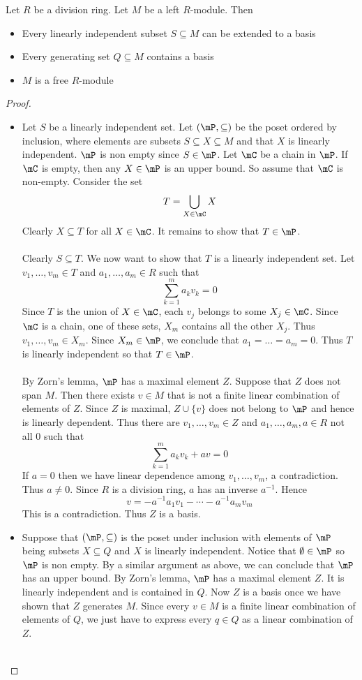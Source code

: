 \documentclass[a4paper]{article}
\begin{document}
\begin{thm}{}{} Let $R$ be a division ring. Let $M$ be a left $R$-module. Then
\begin{itemize}
\item Every linearly independent subset $S\subseteq M$ can be extended to a basis
\item Every generating set $Q\subseteq M$ contains a basis
\item $M$ is a free $R$-module
\end{itemize} 
\begin{proof}~\\
\begin{itemize}
\item Let $S$ be a linearly independent set. Let $(\mP,\subseteq)$ be the poset ordered by inclusion, where elements are subsets $S\subseteq X\subseteq M$ and that $X$ is linearly independent. $\mP$ is non empty since $S\in\mP$. Let $\mC$ be a chain in $\mP$. If $\mC$ is empty, then any $X\in\mP$ is an upper bound. So assume that $\mC$ is non-empty. Consider the set $$T=\bigcup_{X\in\mC}X$$ Clearly $X\subseteq T$ for all $X\in\mC$. It remains to show that $T\in\mP$. \\~\\

Clearly $S\subseteq T$. We now want to show that $T$ is a linearly independent set. Let $v_1,\dots,v_m\in T$ and $a_1,\dots,a_m\in R$ such that $$\sum_{k=1}^ma_kv_k=0$$ Since $T$ is the union of $X\in\mC$, each $v_j$ belongs to some $X_j\in\mC$. Since $\mC$ is a chain, one of these sets, $X_m$ contains all the other $X_j$. Thus $v_1,\dots,v_m\in X_m$. Since $X_m\in\mP$, we conclude that $a_1=\dots=a_m=0$. Thus $T$ is linearly independent so that $T\in\mP$. \\~\\

By Zorn's lemma, $\mP$ has a maximal element $Z$. Suppose that $Z$ does not span $M$. Then there exists $v\in M$ that is not a finite linear combination of elements of $Z$. Since $Z$ is maximal, $Z\cup\{v\}$ does not belong to $\mP$ and hence is linearly dependent. Thus there are $v_1,\dots,v_m\in Z$ and $a_1,\dots,a_m,a\in R$ not all $0$ such that $$\sum_{k=1}^ma_kv_k+av=0$$ If $a=0$ then we have linear dependence among $v_1,\dots,v_m$, a contradiction. Thus $a\neq 0$. Since $R$ is a division ring, $a$ has an inverse $a^{-1}$. Hence $$v=-a^{-1}a_1v_1-\cdots-a^{-1}a_mv_m$$ This is a contradiction. Thus $Z$ is a basis. 

\item Suppose that $(\mP,\subseteq)$ is the poset under inclusion with elements of $\mP$ being subsets $X\subseteq Q$ and $X$ is linearly independent. Notice that $\emptyset\in\mP$ so $\mP$ is non empty. By a similar argument as above, we can conclude that $\mP$ has an upper bound. By Zorn's lemma, $\mP$ has a maximal element $Z$. It is linearly independent and is contained in $Q$. Now $Z$ is a basis once we have shown that $Z$ generates $M$. Since every $v\in M$ is a finite linear combination of elements of $Q$, we just have to express every $q\in Q$ as a linear combination of $Z$. \\~\\


\end{itemize}
\end{proof}
\end{thm}
\end{document}
